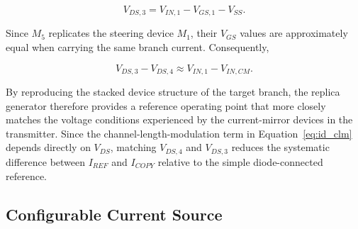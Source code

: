 \begin{equation}
    V_{DS,3}
    = V_{IN,1}-V_{GS,1}-V_{SS}.
\end{equation}

Since $M_5$ replicates the steering device $M_1$, their $V_{GS}$ values are approximately equal when carrying the same branch current. Consequently,

\begin{equation}
    V_{DS,3}-V_{DS,4}
    \approx V_{IN,1}-V_{IN,CM}.
\end{equation}


By reproducing the stacked device structure of the target branch, the replica generator therefore provides a reference operating point that more closely matches the voltage conditions experienced by the current-mirror devices in the transmitter. Since the channel-length-modulation term in Equation~\ref{eq:id_clm} depends directly on $V_{DS}$, matching $V_{DS,4}$ and $V_{DS,3}$ reduces the systematic difference between $I_{REF}$ and $I_{COPY}$ relative to the simple diode-connected reference.


\subsection{Configurable Current Source}

